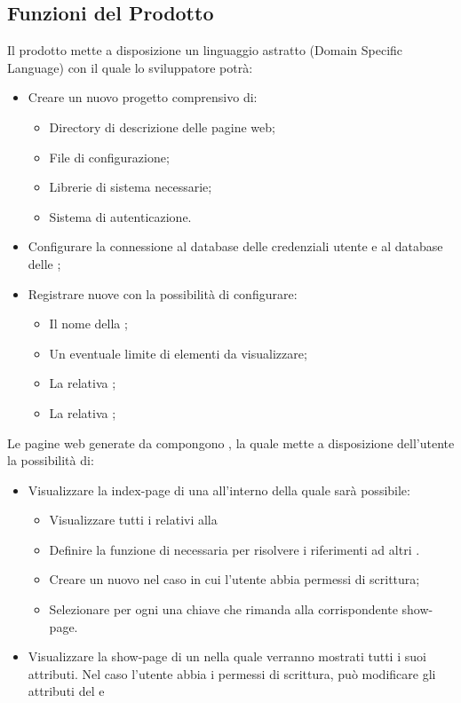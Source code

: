 	\subsection{Funzioni del Prodotto}
	Il prodotto  mette a disposizione un linguaggio astratto  (Domain Specific Language) con il quale lo sviluppatore potrà:
	\begin{itemize}
		\item Creare un nuovo progetto comprensivo di:
			\begin{itemize}
			\item Directory di descrizione delle pagine web;
			\item File di configurazione;
			\item Librerie di sistema necessarie;
			\item Sistema di autenticazione. 
			\end{itemize}
		\item Configurare la connessione al database delle credenziali utente e al database delle ;
		\item Registrare nuove  con la possibilità di configurare:
		\begin{itemize}
		\item Il nome della ;
		\item Un eventuale limite di elementi da visualizzare;
		\item La relativa ;
		\item La relativa ;
		\end{itemize}
	\end{itemize}
	
	Le pagine web generate da  compongono , la quale mette a disposizione dell'utente la possibilità di:
	\begin{itemize}
	\item Visualizzare la index-page di una  all'interno della quale sarà possibile:
	\begin{itemize}
		\item Visualizzare tutti i  relativi alla 
		\item Definire la funzione \textit{} di  necessaria per risolvere i riferimenti ad altri . 
		\item Creare un nuovo  nel caso in cui l'utente abbia permessi di scrittura;
		\item Selezionare per ogni  una chiave che rimanda alla corrispondente show-page.
	\end{itemize}
	
	\item Visualizzare la show-page di un  nella quale verranno mostrati tutti i suoi attributi. Nel caso l'utente abbia i permessi di scrittura, può modificare gli attributi del  e 
	\end{itemize}
		

